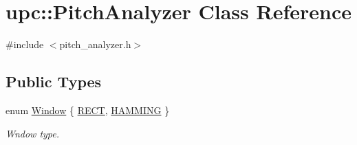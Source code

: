 \hypertarget{classupc_1_1PitchAnalyzer}{}\section{upc\+:\+:Pitch\+Analyzer Class Reference}
\label{classupc_1_1PitchAnalyzer}


{\ttfamily \#include $<$pitch\+\_\+analyzer.\+h$>$}

\subsection*{Public Types}
\begin{DoxyCompactItemize}
\item 
enum \hyperlink{classupc_1_1PitchAnalyzer_ab82b7694d6bc72839e5be6e526be81b6}{Window} \{ \hyperlink{classupc_1_1PitchAnalyzer_ab82b7694d6bc72839e5be6e526be81b6ae89513dddf240af8bbef3358597f244c}{R\+E\+CT}, 
\hyperlink{classupc_1_1PitchAnalyzer_ab82b7694d6bc72839e5be6e526be81b6a20e793e736a503aacbed0294970a9b33}{H\+A\+M\+M\+I\+NG}
 \}\begin{DoxyCompactList}\small\item\em Wndow type. \end{DoxyCompactList}
\end{DoxyCompactItemize}
